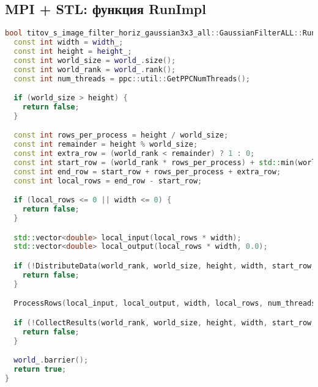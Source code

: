 \documentclass[12pt]{article}
\begin{document}
\subsection*{MPI + STL: функция RunImpl}
\begin{lstlisting}[language=C++]
bool titov_s_image_filter_horiz_gaussian3x3_all::GaussianFilterALL::RunImpl() {
  const int width = width_;
  const int height = height_;
  const int world_size = world_.size();
  const int world_rank = world_.rank();
  const int num_threads = ppc::util::GetPPCNumThreads();

  if (world_size > height) {
    return false;
  }

  const int rows_per_process = height / world_size;
  const int remainder = height % world_size;
  const int extra_row = (world_rank < remainder) ? 1 : 0;
  const int start_row = (world_rank * rows_per_process) + std::min(world_rank, remainder);
  const int end_row = start_row + rows_per_process + extra_row;
  const int local_rows = end_row - start_row;

  if (local_rows <= 0 || width <= 0) {
    return false;
  }

  std::vector<double> local_input(local_rows * width);
  std::vector<double> local_output(local_rows * width, 0.0);

  if (!DistributeData(world_rank, world_size, height, width, start_row, end_row, local_input)) {
    return false;
  }

  ProcessRows(local_input, local_output, width, local_rows, num_threads);

  if (!CollectResults(world_rank, world_size, height, width, start_row, local_output)) {
    return false;
  }

  world_.barrier();
  return true;
}
\end{lstlisting}
\end{document}
